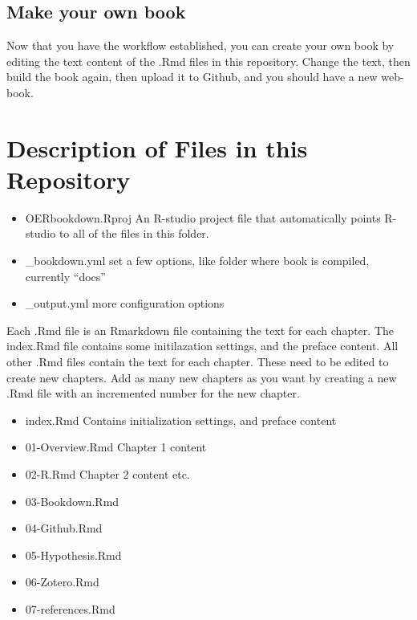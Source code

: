 \documentclass[
]{book}
\providecommand{\tightlist}{%
  \setlength{\itemsep}{0pt}\setlength{\parskip}{0pt}}
\begin{document}
\hypertarget{make-your-own-book}{%
\subsection{Make your own book}\label{make-your-own-book}}

Now that you have the workflow established, you can create your own book by editing the text content of the .Rmd files in this repository. Change the text, then build the book again, then upload it to Github, and you should have a new web-book.

\hypertarget{description-of-files-in-this-repository}{%
\section{Description of Files in this Repository}\label{description-of-files-in-this-repository}}

\begin{itemize}
\item
  OERbookdown.Rproj An R-studio project file that automatically points R-studio to all of the files in this folder.
\item
  \_bookdown.yml set a few options, like folder where book is compiled, currently ``docs''
\item
  \_output.yml more configuration options
\end{itemize}

Each .Rmd file is an Rmarkdown file containing the text for each chapter. The index.Rmd file contains some initilazation settings, and the preface content. All other .Rmd files contain the text for each chapter. These need to be edited to create new chapters. Add as many new chapters as you want by creating a new .Rmd file with an incremented number for the new chapter.

\begin{itemize}
\tightlist
\item
  index.Rmd Contains initialization settings, and preface content
\item
  01-Overview.Rmd Chapter 1 content
\item
  02-R.Rmd Chapter 2 content etc.
\item
  03-Bookdown.Rmd
\item
  04-Github.Rmd
\item
  05-Hypothesis.Rmd
\item
  06-Zotero.Rmd
\item
  07-references.Rmd
\end{itemize}
\end{document}
